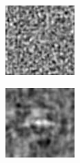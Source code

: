 \documentclass{article}
\begin{document}
\begin{figure}[h!]
\begin{subfigure}[b]{0.1\textwidth}
    \end{subfigure}
    \hspace{-1\baselineskip}
    \quad
    \begin{subfigure}[b]{0.1\textwidth}   
        \centering 
        \includegraphics[width=\textwidth]{plots/B_log_SE2_template.jpg}

    \end{subfigure}
    \hspace{-1\baselineskip}
    \quad
    \begin{subfigure}[b]{0.1\textwidth}   
        \centering 
        \includegraphics[width=\textwidth]{plots/C_log_SE2_template.jpg}


\end{subfigure}
\end{figure}
\end{document}
